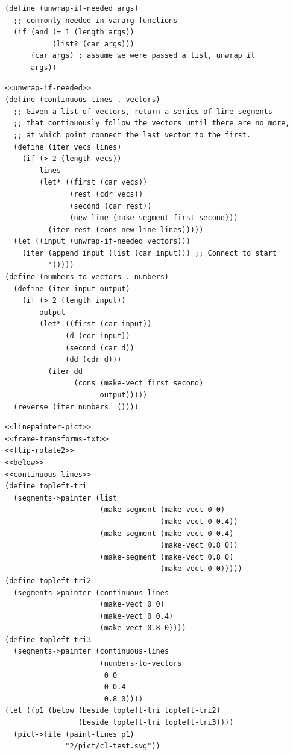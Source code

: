 \documentclass[final,fleqn,titlepage,twoside]{article}
\begin{document}
\begin{verbatim}
(define (unwrap-if-needed args)
  ;; commonly needed in vararg functions
  (if (and (= 1 (length args))
           (list? (car args)))
      (car args) ; assume we were passed a list, unwrap it
      args))
\end{verbatim}
\begin{verbatim}
<<unwrap-if-needed>>
(define (continuous-lines . vectors)
  ;; Given a list of vectors, return a series of line segments
  ;; that continuously follow the vectors until there are no more,
  ;; at which point connect the last vector to the first.
  (define (iter vecs lines)
    (if (> 2 (length vecs))
        lines
        (let* ((first (car vecs))
               (rest (cdr vecs))
               (second (car rest))
               (new-line (make-segment first second)))
          (iter rest (cons new-line lines)))))
  (let ((input (unwrap-if-needed vectors)))
    (iter (append input (list (car input))) ;; Connect to start
          '())))
(define (numbers-to-vectors . numbers)
  (define (iter input output)
    (if (> 2 (length input))
        output
        (let* ((first (car input))
              (d (cdr input))
              (second (car d))
              (dd (cdr d)))
          (iter dd
                (cons (make-vect first second)
                      output)))))
  (reverse (iter numbers '())))
\end{verbatim}

\begin{verbatim}
<<linepainter-pict>>
<<frame-transforms-txt>>
<<flip-rotate2>>
<<below>>
<<continuous-lines>>
(define topleft-tri
  (segments->painter (list
                      (make-segment (make-vect 0 0)
                                    (make-vect 0 0.4))
                      (make-segment (make-vect 0 0.4)
                                    (make-vect 0.8 0))
                      (make-segment (make-vect 0.8 0)
                                    (make-vect 0 0)))))
(define topleft-tri2
  (segments->painter (continuous-lines
                      (make-vect 0 0)
                      (make-vect 0 0.4)
                      (make-vect 0.8 0))))
(define topleft-tri3
  (segments->painter (continuous-lines
                      (numbers-to-vectors
                       0 0
                       0 0.4
                       0.8 0))))
(let ((p1 (below (beside topleft-tri topleft-tri2)
                 (beside topleft-tri topleft-tri3))))
  (pict->file (paint-lines p1)
              "2/pict/cl-test.svg"))
\end{verbatim}
\end{document}

